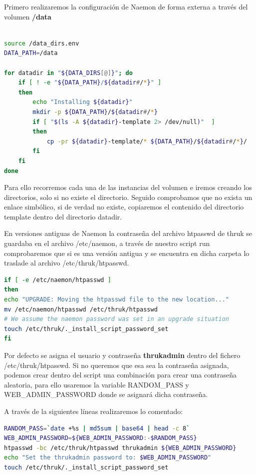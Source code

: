 Primero realizaremos la configuración de Naemon de forma externa a través del volumen \textbf{/data}
\begin{lstlisting}[language=bash]

source /data_dirs.env
DATA_PATH=/data

for datadir in "${DATA_DIRS[@]}"; do
	if [ ! -e "${DATA_PATH}/${datadir#/*}" ]
	then
		echo "Installing ${datadir}"
		mkdir -p ${DATA_PATH}/${datadir#/*}
		if [ "$(ls -A ${datadir}-template 2> /dev/null)"  ]
		then
			cp -pr ${datadir}-template/* ${DATA_PATH}/${datadir#/*}/
		fi
	fi
done

\end{lstlisting}

Para ello recorremos cada una de las instancias del volumen e iremos creando los directorios, solo si no existe el directorio. Seguido comprobamos que no exista un enlace simbólico, si de verdad no existe, copiaremos el contenido del directorio template dentro del directorio datadir.

En versiones antiguas de Naemon la contraseña del archivo htpasswd de thruk se guardaba en el archivo /etc/naemon, a través de nuestro script run comprobaremos que si es una versión antigua y se encuentra en dicha carpeta lo traslade al archivo /etc/thruk/htpasswd.

\begin{lstlisting}[language=bash]
if [ -e /etc/naemon/htpasswd ]
then
echo "UPGRADE: Moving the htpasswd file to the new location..."
mv /etc/naemon/htpasswd /etc/thruk/htpasswd
# We assume the naemon password was set in an upgrade situation
touch /etc/thruk/._install_script_password_set
fi
\end{lstlisting}

Por defecto se asigna el usuario y contraseña \textbf{thrukadmin} dentro del fichero /etc/thruk/htpasswd.
\newpage
Si no queremos que esa sea la contraseña asignada, podemos crear dentro del script una combinación para crear una contraseña aleatoria, para ello usaremos la variable RANDOM\_PASS y WEB\_ADMIN\_PASSWORD donde se asignará dicha contraseña.

A través de la siguientes líneas realizaremos lo comentado:


\begin{lstlisting}[language=bash]
RANDOM_PASS=`date +%s | md5sum | base64 | head -c 8`
WEB_ADMIN_PASSWORD=${WEB_ADMIN_PASSWORD:-$RANDOM_PASS}
htpasswd -bc /etc/thruk/htpasswd thrukadmin ${WEB_ADMIN_PASSWORD}
echo "Set the thrukadmin password to: $WEB_ADMIN_PASSWORD"
touch /etc/thruk/._install_script_password_set
\end{lstlisting}


